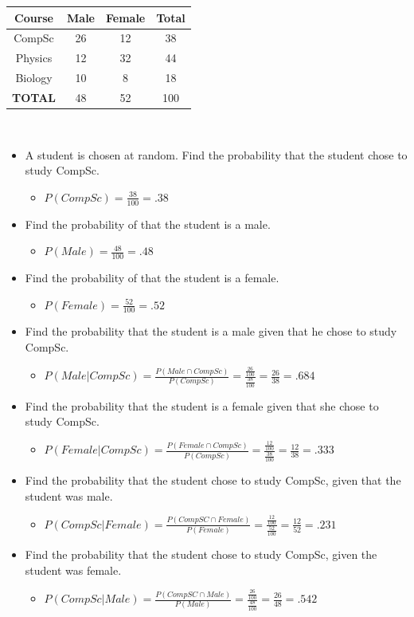 \documentclass[12pt]{article}
\begin{document}
\begin{tabular}{|c|c|c|c|}
  \hline
  Course & Male & Female & Total\\
  \hline
  CompSc & 26 & 12 & 38 \\
  \hline
  Physics & 12 & 32 & 44\\
  \hline
  Biology & 10 & 8 & 18\\
  \hline
  \textbf{TOTAL} & 48 & 52 & 100 \\
  \hline
\end{tabular}
\\
  \begin{itemize}
    \item A student is chosen at random. Find the probability that the student chose to study CompSc.
    \begin{itemize}
      \item $P(CompSc)= \frac{38}{100}=.38$
    \end{itemize}
    \item Find the probability of that the student is a male.
    \begin{itemize}
      \item $P(Male)= \frac{48}{100}=.48$
    \end{itemize}
    \item Find the probability of that the student is a female.
    \begin{itemize}
      \item $P(Female)= \frac{52}{100}=.52$
    \end{itemize}
    \item Find the probability that the student is a male given that he chose to study CompSc.
    \begin{itemize}
      \item $P(Male|CompSc)= \frac{P(Male \cap CompSc)}{P(CompSc)}=\frac{\frac{26}{100}}{\frac{38}{100}}=\frac{26}{38}=.684$
    \end{itemize}
    \item Find the probability that the student is a female given that she chose to study CompSc.
    \begin{itemize}
      \item $P(Female|CompSc)= \frac{P(Female \cap CompSc)}{P(CompSc)}=\frac{\frac{12}{100}}{\frac{38}{100}}=\frac{12}{38}=.333$
    \end{itemize}
    \item Find the probability that the student chose to study CompSc, given that the student was male.
    \begin{itemize}
      \item $P(CompSc|Female)= \frac{P(CompSC \cap Female)}{P(Female)}=\frac{\frac{12}{100}}{\frac{52}{100}}=\frac{12}{52}=.231$
    \end{itemize}
    \item Find the probability that the student chose to study CompSc, given the student was female.
    \begin{itemize}
      \item $P(CompSc|Male)= \frac{P(CompSC \cap Male)}{P(Male)}=\frac{\frac{26}{100}}{\frac{48}{100}}=\frac{26}{48}=.542$
    \end{itemize}
  \end{itemize}
\end{document}

